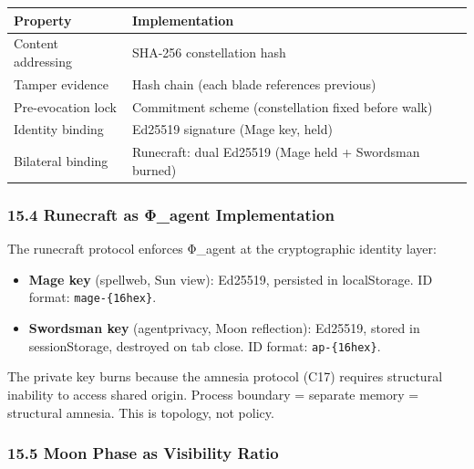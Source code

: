 \documentclass[
  11pt,
]{article}
\newcounter{none} %
\providecommand{\tightlist}{%
  \setlength{\itemsep}{0pt}\setlength{\parskip}{0pt}}
\begin{document}
{\def\LTcaptype{none} %
\begin{longtable}[]{@{}
  >{\raggedright\arraybackslash}p{}
  >{\raggedright\arraybackslash}p{}@{}}
\toprule\noalign{}
\begin{minipage}[b]{\linewidth}\raggedright
Property
\end{minipage} & \begin{minipage}[b]{\linewidth}\raggedright
Implementation
\end{minipage} \\
\midrule\noalign{}
\endhead
\bottomrule\noalign{}
\endlastfoot
Content addressing & SHA-256 constellation hash \\
Tamper evidence & Hash chain (each blade references previous) \\
Pre-evocation lock & Commitment scheme (constellation fixed before
walk) \\
Identity binding & Ed25519 signature (Mage key, held) \\
Bilateral binding & Runecraft: dual Ed25519 (Mage held + Swordsman
burned) \\
\end{longtable}
}

\subsubsection{15.4 Runecraft as Φ\_agent
Implementation}\label{runecraft-as-ux3c6_agent-implementation}

The runecraft protocol enforces Φ\_agent at the cryptographic identity
layer:

\begin{itemize}
\tightlist
\item
  \textbf{Mage key} (spellweb, Sun view): Ed25519, persisted in
  localStorage. ID format: \texttt{mage-\{16hex\}}.
\item
  \textbf{Swordsman key} (agentprivacy, Moon reflection): Ed25519,
  stored in sessionStorage, destroyed on tab close. ID format:
  \texttt{ap-\{16hex\}}.
\end{itemize}

The private key burns because the amnesia protocol (C17) requires
structural inability to access shared origin. Process boundary =
separate memory = structural amnesia. This is topology, not policy.

\subsubsection{15.5 Moon Phase as Visibility
Ratio}\label{moon-phase-as-visibility-ratio}
\end{document}
